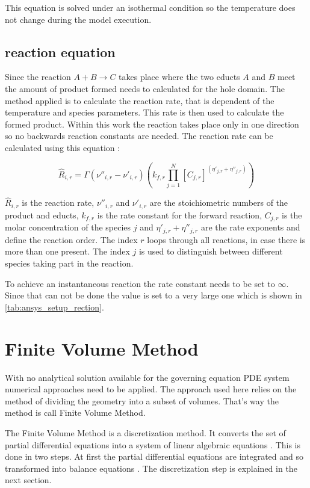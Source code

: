 \documentclass[../thesis.tex]{subfiles}
\begin{document}
This equation is solved under an isothermal condition so the temperature does not change during the model execution. 

\subsection{reaction equation}
\label{sec: reaction_eqn}

Since the reaction $ A + B \rightarrow C$ takes place where the two educts $A$ and $B$ meet the amount of product formed needs to calculated for the hole domain. The method applied is to calculate the reaction rate, that is dependent of the temperature and species parameters. This rate is then used to calculate the formed product. Within this work the reaction takes place only in one direction so no backwards reaction constants are needed. The reaction rate can be calculated using this equation \cite{manual2009ansys}:

\begin{equation}
\label{eqn:reaction}
\hat{R}_{i,r} = {\Gamma} \left(\nu''_{i,r} - \nu'_{i,r} \right) \left(k_{f,r} \prod_{j=1}^{N} \left[C_{j,r} \right]^{(\eta'_{j,r} + \eta''_{j,r})} \right) 
\end{equation}

$\hat{R}_{i,r}$ is the reaction rate, $\nu''_{i,r}$ and $\nu'_{i,r}$ are the stoichiometric numbers of the product and educts, $k_{f,r}$ is the rate constant for the forward reaction, $C_{j,r}$ is the molar concentration of the species $j$ and $\eta'_{j,r} + \eta''_{j,r}$ are the rate exponents and define the reaction order. 
The index $r$ loops through all reactions, in case there is more than one present. The index $j$ is used to distinguish between different species taking part in the reaction.

To achieve an instantaneous reaction the rate constant needs to be set to $\infty$. Since that can not be done the value is set to a very large one which is shown in \autoref{tab:ansys_setup_rection}. 

\section{Finite Volume Method}
With no analytical solution available for the governing equation PDE system numerical approaches need to be applied. The approach used here relies on the method of dividing the geometry into a subset of volumes. That's way the method is call Finite Volume Method.

The Finite Volume Method is a discretization method. It converts the set of partial differential equations into a system of linear algebraic equations \cite{darwish2021finite}. This is done in two steps. At first the partial differential equations are integrated and so transformed into balance equations \cite{darwish2021finite}. The discretization step is explained in the next section.
\end{document}

